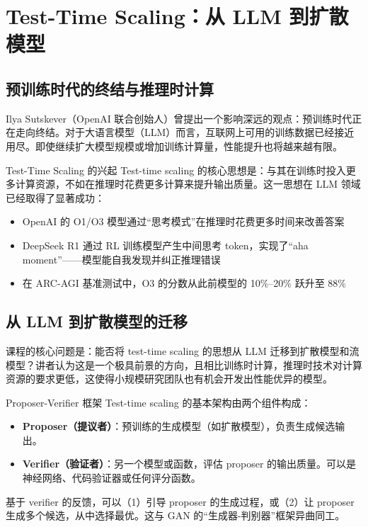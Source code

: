 \documentclass[a4paper]{article}
\begin{document}
\section{Test-Time Scaling：从 LLM 到扩散模型}

\subsection{预训练时代的终结与推理时计算}

Ilya Sutskever（OpenAI 联合创始人）曾提出一个影响深远的观点：预训练时代正在走向终结。对于大语言模型（LLM）而言，互联网上可用的训练数据已经接近用尽。即使继续扩大模型规模或增加训练计算量，性能提升也将越来越有限。

\begin{knowledgebox}{Test-Time Scaling 的兴起}
Test-time scaling 的核心思想是：与其在训练时投入更多计算资源，不如在推理时花费更多计算来提升输出质量。这一思想在 LLM 领域已经取得了显著成功：
\begin{itemize}
    \item OpenAI 的 O1/O3 模型通过``思考模式''在推理时花费更多时间来改善答案
    \item DeepSeek R1 通过 RL 训练模型产生中间思考 token，实现了``aha moment''——模型能自我发现并纠正推理错误
    \item 在 ARC-AGI 基准测试中，O3 的分数从此前模型的 10\%--20\% 跃升至 88\%
\end{itemize}
\end{knowledgebox}

\subsection{从 LLM 到扩散模型的迁移}

课程的核心问题是：能否将 test-time scaling 的思想从 LLM 迁移到扩散模型和流模型？讲者认为这是一个极具前景的方向，且相比训练时计算，推理时技术对计算资源的要求更低，这使得小规模研究团队也有机会开发出性能优异的模型。

\begin{importantbox}{Proposer-Verifier 框架}
Test-time scaling 的基本架构由两个组件构成：
\begin{itemize}
    \item \textbf{Proposer（提议者）}：预训练的生成模型（如扩散模型），负责生成候选输出。
    \item \textbf{Verifier（验证者）}：另一个模型或函数，评估 proposer 的输出质量。可以是神经网络、代码验证器或任何评分函数。
\end{itemize}
基于 verifier 的反馈，可以（1）引导 proposer 的生成过程，或（2）让 proposer 生成多个候选，从中选择最优。这与 GAN 的``生成器-判别器''框架异曲同工。
\end{importantbox}
\end{document}
